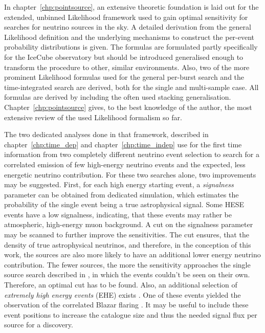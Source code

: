 In chapter~\ref{chp:pointsource}, an extensive theoretic foundation is laid out for the extended, unbinned Likelihood framework used to gain optimal sensitivity for searches for neutrino sources in the sky.
A detailed derivation from the general Likelihood definition and the underlying mechanisms to construct the per-event probability distributions is given.
The formulas are formulated partly specifically for the IceCube observatory but should be introduced generalised enough to transform the procedure to other, similar environments.
Also, two of the more prominent Likelihood formulas used for the general per-burst search and the time-integrated search are derived, both for the single and multi-sample case.
All formulas are derived by including the often used stacking generalisation.
Chapter~\ref{chp:pointsource} gives, to the best knowledge of the author, the most extensive review of the used Likelihood formalism so far.

The two dedicated analyses done in that framework, described in chapter~\ref{chp:time_dep} and chapter~\ref{chp:time_indep} use for the first time information from two completely different neutrino event selection to search for a correlated emission of few high-energy neutrino events and the expected, less energetic neutrino contribution.
For these two searches alone, two improvements may be suggested.
First, for each high energy starting event, a \emph{signalness} parameter can be obtained from dedicated simulation, which estimates the probability of the single event being a true astrophysical signal.
Some HESE events have a low signalness, indicating, that these events may rather be atmospheric, high-energy muon background.
A cut on the signalness parameter may be scanned to further improve the sensitivities.
The cut ensures, that the density of true astrophysical neutrinos, and therefore, in the conception of this work, the sources are also more likely to have an additional lower energy neutrino contribution.
The fewer sources, the more the sensitivity approaches the single source search described in \CITE{}, in which the events couldn't be seen on their own.
Therefore, an optimal cut has to be found.
Also, an additional selection of \emph{extremely high energy events} (EHE) exists \cite{Yoshida:2017ghs,Aartsen:2016ngq}.
One of these events yielded the observation of the correlated Blazar flaring \cite{IceCube:2018cha}.
It may be useful to include these event positions to increase the catalogue size and thus the needed signal flux per source for a discovery.

